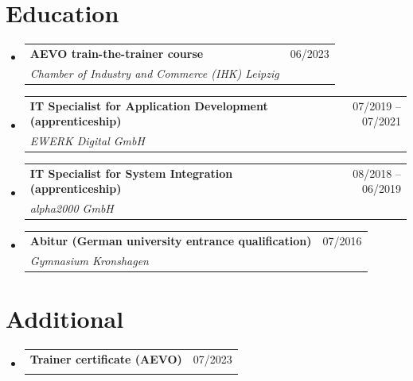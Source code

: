 \documentclass[a4paper,11pt]{article}
\makeatletter
\newcommand{\resumeSubheading}[4]{
  \vspace{-2pt}\item
    \begin{tabular*}{0.97\textwidth}[t]{l@{\extracolsep{\fill}}r}
      \textbf{#1} & #2 \\
      \textit{\small#3} & \textit{\small #4} \\
    \end{tabular*}\vspace{-7pt}
}
\newcommand{\resumeSubHeadingListStart}{\begin{itemize}[leftmargin=0.15in, label={}]}
\newcommand{\resumeSubHeadingListEnd}{\end{itemize}}
\makeatother
\begin{document}
\section{Education}
  \resumeSubHeadingListStart
    \resumeSubheading
      {AEVO train-the-trainer course}{06/2023}
      {Chamber of Industry and Commerce (IHK) Leipzig}{}
    \resumeSubheading
      {IT Specialist for Application Development (apprenticeship)}{07/2019 -- 07/2021}
      {EWERK Digital GmbH}{}
    \resumeSubheading
      {IT Specialist for System Integration (apprenticeship)}{08/2018 -- 06/2019}
      {alpha2000 GmbH}{}
    \resumeSubheading
      {Abitur (German university entrance qualification)}{07/2016}
      {Gymnasium Kronshagen}{}
  \resumeSubHeadingListEnd


\section{Additional}
  \resumeSubHeadingListStart
    \resumeSubheading
      {Trainer certificate (AEVO)}{07/2023}
      {}{}
  \resumeSubHeadingListEnd


\end{document}
